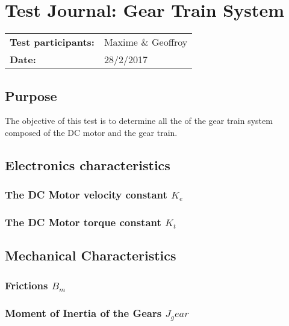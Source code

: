 \graphicspath{{figures/appendix/"Motor&GearTests"/}}
\chapter{Test Journal: Gear Train System}\label{appendix:DCMotorInductance}
\begin{table}[htbp]
\begin{tabular}{l l}
\textbf{Test participants:} & Maxime \& Geoffroy  \\
\textbf{Date:}  & 28/2/2017
\end{tabular}
\end{table}

\section*{Purpose}
The objective of this test is to determine all the of the gear train system composed of the DC motor and the gear train.
\section{Electronics characteristics}



\subsection{The DC Motor velocity constant $K_e$}



\subsection{The DC Motor torque constant $K_t$}


\section{Mechanical Characteristics}

\subsection{Frictions $B_m$}


\subsection{Moment of Inertia of the Gears $J_gear$}




